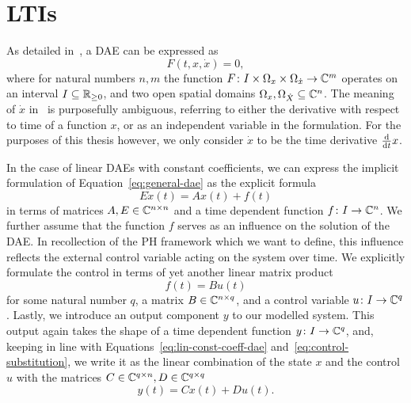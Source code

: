 \section{\aclp{LTI}}\label{sec:ltis}

As detailed in~\cite{Kunkel2006}, a \acf{DAE} can be expressed as
\begin{equation}\label{eq:general-dae}
    F(t, x, \dot{x}) = 0,
\end{equation}
where for natural numbers $n, m$ the function $F \colon I \times \Omega_x \times \Omega_{\dot{x}} \to \mathbb{C}^m$ operates on an interval $I \subseteq \mathbb{R}_{\ge 0}$, and two open spatial domains $\Omega_x, \Omega_{\dot{X}} \subseteq \mathbb{C}^n$.
The meaning of $\dot{x}$ in~\cite{Kunkel2006} is purposefully ambiguous, referring to either the derivative with respect to time of a function $x$, or as an independent variable in the formulation.
For the purposes of this thesis however, we only consider $\dot{x}$ to be the time derivative $\frac{\mathop{}\!\mathrm{d}}{\mathop{}\!\mathrm{d} t} x$.

In the case of linear \acp{DAE} with constant coefficients, we can express the implicit formulation of Equation~\eqref{eq:general-dae} as the explicit formula
\begin{equation}\label{eq:lin-const-coeff-dae}
    E \dot{x}(t) = A x(t) + f(t)
\end{equation}
in terms of matrices $A, E \in \mathbb{C}^{n \times n}$ and a time dependent function $f \colon I \to \mathbb{C}^n$.
We further assume that the function $f$ serves as an influence on the solution of the \ac{DAE}.
In recollection of the \ac{PH} framework which we want to define, this influence reflects the external control variable acting on the system over time.
We explicitly formulate the control in terms of yet another linear matrix product
\begin{equation}\label{eq:control-substitution}
    f(t) = B u(t)
\end{equation}
for some natural number $q$, a matrix $B \in \mathbb{C}^{n \times q}$, and a control variable $u \colon I \to \mathbb{C}^q$.
Lastly, we introduce an output component $y$ to our modelled system.
This output again takes the shape of a time dependent function $y \colon I \to \mathbb{C}^q$, and, keeping in line with Equations~\eqref{eq:lin-const-coeff-dae} and~\eqref{eq:control-substitution}, we write it as the linear combination of the state $x$ and the control $u$ with the matrices $C \in \mathbb{C}^{q \times n}, D \in \mathbb{C}^{q \times q}$
\begin{equation}\label{eq:output-definition}
    y(t) = C x(t) + D u(t).
\end{equation}

